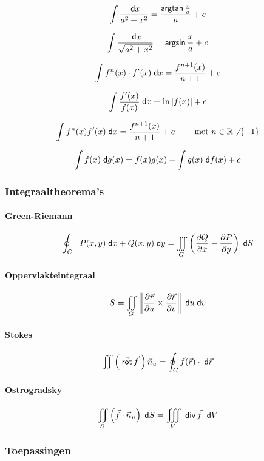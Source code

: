 \[
  \int \frac{\;\textsf{d}x}{a^2+x^2} = \frac{\mbox{\textsf{argtan}}\, \frac{x}{a}}{a} + c
\]

\[
  \int \frac{\;\textsf{d}x}{\sqrt{a^2+x^2}} = \mbox{\textsf{argsin}}\, \frac{x}{a} + c
\]

\[
 \int f^n (x) \cdot f' (x) \;\textsf{d}x = \frac{f^{n+1}(x)}{n+1} + c
\]

\[
 \int \frac{f'(x)}{f(x)} \;\textsf{d}x = \ln\left|f(x)\right|+c
\]

\[
 \int f^n(x)f'(x)\;\textsf{d}x = \frac{f^{n+1}(x)}{n+1} + c \qquad \mbox{ met } n \in \mathbb{R} \not \; \left\{-1\right\}
\]

\[
 \int f(x)\;\textsf{d}g(x) = f(x)g(x) - \int g(x) \;\textsf{d}f(x) + c
\]

\onecolumn

\subsubsection{Integraaltheorema's }
\label{sec:Integraaltheoremas}

\paragraph{Green-Riemann}
\[
  \oint_{C+} P(x,y)\;\textsf{d}x + Q(x,y)\;\textsf{d}y = \iint_G \left(\frac{\partial Q}{\partial x} - \frac{\partial P}{\partial y}\right)\;\textsf{d}S
\]

\paragraph{Oppervlakteintegraal}
\[
  S = \iint_G \left\| \frac{\partial \vec{r}}{\partial u} \times \frac{\partial \vec{r}}{\partial v} \right\| \;\textsf{d}u\;\textsf{d}v
\]

\paragraph{Stokes}
\[
  \iint \left(\;\vec{\textsf{rot}}\,\vec{f}\;\right) \vec{n}_u = \oint_C \vec{f}(\vec{r}) \cdot \;\textsf{d}\vec{r}
\]

\paragraph{Ostrogradsky}
\[
  \iint_S \left( \vec{f} \cdot \vec{n}_u\right) \;\textsf{d}S = \iiint_V \;\textsf{div}\,\vec{f}\; \;\textsf{d}V
\]



\subsubsection{Toepassingen}
\label{sec:Toepassingen}
